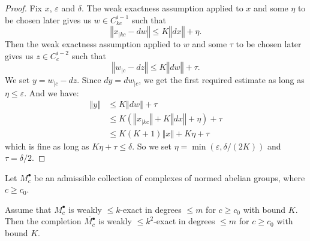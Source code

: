 \begin{proof}
  Fix $x$, $ε$ and $δ$. The weak exactness assumption applied to $x$ and some $η$ to be chosen later gives us
  $w ∈ C_{kc}^{i-1}$ such that
  \[
    ‖x_{|kc} - dw‖ ≤  K ‖dx‖ + η.
  \]
  Then the weak exactness assumption applied to $w$ and some $τ$ to be chosen later gives us
  $z ∈ C_{c}^{i-2}$ such that
  \[
    ‖w_{|c} - dz‖ ≤  K ‖dw‖ + τ.
  \]
  We set $y = w_{|c} - dz$. Since $dy = dw_{|c}$, we get the first required estimate as long
  as $η ≤ ε$. And we have:
  \begin{align*}
    ‖y‖ &≤ K ‖dw‖ + τ \\
        &≤ K (‖x_{|kc}‖ + K‖dx‖ + η) + τ \\
        &≤ K(K + 1) ‖x‖ + Kη + τ
  \end{align*}
  which is fine as long as $Kη + τ ≤ δ$.
  So we set $η = \min(ε, δ/(2K))$ and $τ = δ/2$.
\end{proof}

\begin{lemma}
  \label{completion_is_weakexact}
  Let $M^\bullet_c$ be an admissible collection
  of complexes of normed abelian groups, where $c\geq c_0$.

  Assume that $M^\bullet_c$ is weakly $\leq k$-exact in degrees $\leq m$ for $c\geq c_0$ with bound $K$.
  Then the completion $\overline{M^\bullet_c}$ is weakly $\leq k^2$-exact in degrees $\leq m$ for $c\geq c_0$ with bound $K$.
\end{lemma}

